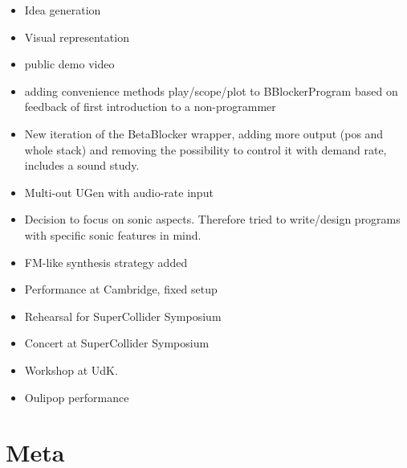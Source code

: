 \documentclass[letterpaper, 12pt]{article}
\begin{document}
\begin{itemize}
\item Idea generation
\item Visual representation
\item public demo video
\item adding convenience methods play/scope/plot to BBlockerProgram based on feedback of first introduction to a non-programmer
\item New iteration of the BetaBlocker wrapper, adding more output (pos and whole stack) and removing the possibility to control it with demand rate,
	includes a sound study.
\item Multi-out UGen with audio-rate input
\item Decision to focus on sonic aspects. Therefore tried to write/design programs with specific sonic features in mind.
\item FM-like synthesis strategy added
\item Performance at Cambridge, fixed setup
\item Rehearsal for SuperCollider Symposium
\item Concert at SuperCollider Symposium
\item Workshop at UdK.
\item Oulipop performance
\end{itemize}



\section{Meta}
\label{sec:meta}
\end{document}
